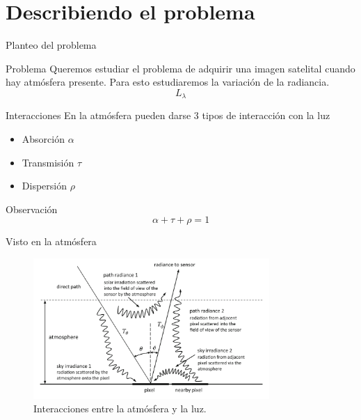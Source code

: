 \documentclass[handout]{beamer}
\begin{document}
\section{Describiendo el problema}

\begin{frame}{Planteo del problema}
  \begin{block}{Problema}
    Queremos estudiar el problema de adquirir una imagen satelital cuando hay atmósfera presente.\pause
    Para esto estudiaremos la variación de la radiancia.
    $$L_\lambda$$
  \end{block}
\end{frame}

\begin{frame}{Interacciones}
  En la atmósfera pueden darse 3 tipos de interacción con la luz\pause
    \begin{itemize}[<+->]
      \item Absorción $\alpha$
      \item Transmisión $\tau$
      \item Dispersión $\rho$
    \end{itemize}\pause
    \begin{block}{Observación}
      \begin{equation}
        \alpha + \tau + \rho = 1
      \end{equation}
    \end{block}
\end{frame}

\begin{frame}{Visto en la atmósfera}
  \begin{figure}
  \centering
  \includegraphics[width=0.8\textwidth]{imagenes/iatmo.png}
  \caption{Interacciones entre la atmósfera y la luz.}
  \end{figure}
\end{frame}
\end{document}
